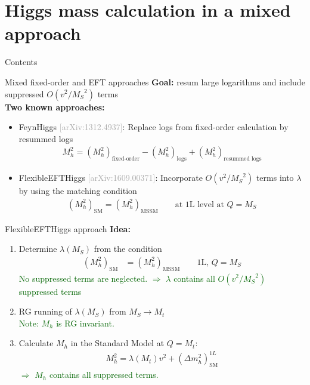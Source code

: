 \documentclass[hyperref={pdfpagelabels=false},ngerman]{beamer}
\newcommand{\MS}{\ensuremath{M_S}}
\newcommand{\mycite}[1]{\textcolor{darkgray}{\tiny [#1]}}
\renewcommand{\emph}{\textbf}
\newcommand{\SM}{\ensuremath{\text{SM}}}
\newcommand{\MSSM}{\ensuremath{\text{MSSM}}}
\begin{document}
\section{Higgs mass calculation in a mixed approach}

\begin{frame}{Contents}
  \tableofcontents[currentsection]  
\end{frame}

\begin{frame}{Mixed fixed-order and EFT approaches}
  \emph{Goal:} resum large logarithms and include suppressed
  $O(v^2/\MS^2)$ terms
  \\[2em]
  \emph{Two known approaches:}
  \begin{itemize}
  \item FeynHiggs \mycite{arXiv:1312.4937}: Replace logs from
    fixed-order calculation by resummed logs
    \begin{align*}
      M_h^2 = (M_h^2)_{\text{fixed-order}} - (M_h^2)_{\text{logs}} + (M_h^2)_{\text{resummed logs}}
    \end{align*}
  \item FlexibleEFTHiggs \mycite{arXiv:1609.00371}: Incorporate
    $O(v^2/\MS^2)$ terms into $\lambda$ by using the matching
    condition
    \begin{align*}
      (M_h^2)_{\SM} = (M_h^2)_{\MSSM} \qquad \text{at 1L level at } Q = \MS
    \end{align*}
  \end{itemize}
\end{frame}

\begin{frame}{FlexibleEFTHiggs approach}
  \emph{Idea:}
  \begin{enumerate}
  \item Determine $\lambda(\MS)$ from the condition
    \begin{align*}
      (M_h^2)_{\SM} &= (M_h^2)_{\MSSM}\qquad \text{1L, } Q = \MS
    \end{align*}
    \textcolor{darkgreen}{No suppressed terms are neglected.
      $\Rightarrow$ $\lambda$ contains all $O(v^2/\MS^2)$ suppressed
      terms}
  \item RG running of $\lambda(\MS)$ from $\MS \rightarrow M_t$\\
    \textcolor{darkgreen}{Note: $M_h$ is RG invariant.}
  \item Calculate $M_h$ in the Standard Model at $Q = M_t$:
    \begin{align*}
      M_h^2 = \lambda(M_t) v^2 + (\Delta m_h^2)^{1L}_{\SM}
    \end{align*}
    \textcolor{darkgreen}{$\Rightarrow$ $M_h$ contains all suppressed
      terms.}
  \end{enumerate}
\end{frame}
\end{document}
